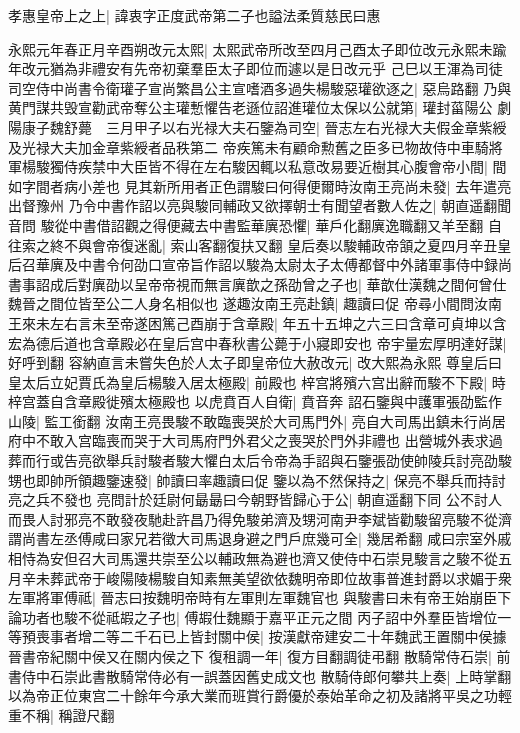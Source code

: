 孝惠皇帝上之上|{
	諱衷字正度武帝第二子也謚法柔質慈民曰惠}


永熙元年春正月辛酉朔改元太熙|{
	太熙武帝所改至四月己酉太子即位改元永熙未踰年改元猶為非禮安有先帝初棄羣臣太子即位而遽以是日改元乎}
己巳以王渾為司徒　司空侍中尚書令衛瓘子宣尚繁昌公主宣嗜酒多過失楊駿惡瓘欲逐之|{
	惡烏路翻}
乃與黄門謀共毁宣勸武帝奪公主瓘慙懼告老遜位詔進瓘位太保以公就第|{
	瓘封菑陽公}
劇陽康子魏舒薨　三月甲子以右光禄大夫石鑒為司空|{
	晉志左右光禄大夫假金章紫綬及光禄大夫加金章紫綬者品秩第二}
帝疾篤未有顧命勲舊之臣多已物故侍中車騎將軍楊駿獨侍疾禁中大臣皆不得在左右駿因輒以私意改易要近樹其心腹會帝小間|{
	間如字間者病小差也}
見其新所用者正色謂駿曰何得便爾時汝南王亮尚未發|{
	去年遣亮出督豫州}
乃令中書作詔以亮與駿同輔政又欲擇朝士有聞望者數人佐之|{
	朝直遥翻聞音問}
駿從中書借詔觀之得便藏去中書監華廙恐懼|{
	華戶化翻廙逸職翻又羊至翻}
自往索之終不與會帝復迷亂|{
	索山客翻復扶又翻}
皇后奏以駿輔政帝頷之夏四月辛丑皇后召華廙及中書令何劭口宣帝旨作詔以駿為太尉太子太傅都督中外諸軍事侍中録尚書事詔成后對廙劭以呈帝帝視而無言廙歆之孫劭曾之子也|{
	華歆仕漢魏之間何曾仕魏晉之間位皆至公二人身名相似也}
遂趣汝南王亮赴鎮|{
	趣讀曰促}
帝尋小間問汝南王來未左右言未至帝遂困篤己酉崩于含章殿|{
	年五十五坤之六三曰含章可貞坤以含宏為德后道也含章殿必在皇后宫中春秋書公薨于小寢即安也}
帝宇量宏厚明達好謀|{
	好呼到翻}
容納直言未嘗失色於人太子即皇帝位大赦改元|{
	改大熙為永熙}
尊皇后曰皇太后立妃賈氏為皇后楊駿入居太極殿|{
	前殿也}
梓宫將殯六宫出辭而駿不下殿|{
	時梓宫蓋自含章殿徙殯太極殿也}
以虎賁百人自衛|{
	賁音奔}
詔石鑒與中護軍張劭監作山陵|{
	監工銜翻}
汝南王亮畏駿不敢臨喪哭於大司馬門外|{
	亮自大司馬出鎮未行尚居府中不敢入宫臨喪而哭于大司馬府門外君父之喪哭於門外非禮也}
出營城外表求過葬而行或告亮欲舉兵討駿者駿大懼白太后令帝為手詔與石鑒張劭使帥陵兵討亮劭駿甥也即帥所領趣鑒速發|{
	帥讀曰率趣讀曰促}
鑒以為不然保持之|{
	保亮不舉兵而持討亮之兵不發也}
亮問計於廷尉何朂朂曰今朝野皆歸心于公|{
	朝直遥翻下同}
公不討人而畏人討邪亮不敢發夜馳赴許昌乃得免駿弟濟及甥河南尹李斌皆勸駿留亮駿不從濟謂尚書左丞傅咸曰家兄若徵大司馬退身避之門戶庶幾可全|{
	幾居希翻}
咸曰宗室外戚相恃為安但召大司馬還共崇至公以輔政無為避也濟又使侍中石崇見駿言之駿不從五月辛未葬武帝于峻陽陵楊駿自知素無美望欲依魏明帝即位故事普進封爵以求媚于衆左軍將軍傅祗|{
	晉志曰按魏明帝時有左軍則左軍魏官也}
與駿書曰未有帝王始崩臣下論功者也駿不從祗嘏之子也|{
	傅嘏仕魏顯于嘉平正元之間}
丙子詔中外羣臣皆增位一等預喪事者增二等二千石已上皆封關中侯|{
	按漢獻帝建安二十年魏武王置關中侯據晉書帝紀關中侯又在關内侯之下}
復租調一年|{
	復方目翻調徒弔翻}
散騎常侍石崇|{
	前書侍中石崇此書散騎常侍必有一誤蓋因舊史成文也}
散騎侍郎何攀共上奏|{
	上時掌翻}
以為帝正位東宫二十餘年今承大業而班賞行爵優於泰始革命之初及諸將平吳之功輕重不稱|{
	稱證尺翻}
